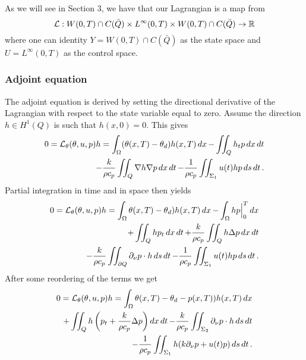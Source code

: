 As we will see in Section 3, we have that our Lagrangian is a map from 
\begin{equation*}
    \mathcal{L} : W(0,T)\cap C(\bar{Q}) \times L^{\infty}(0,T) \times  W(0,T) \cap C(\bar{Q}) \rightarrow \mathbb{R}
\end{equation*}
where one can identity $Y = W(0,T) \cap C(\bar{Q})$ as the state space and $U = L^{\infty}(0,T)$ as the control space. 

\subsubsection{Adjoint equation}
The adjoint equation is derived by setting the directional derivative of the Lagrangian with respect to the state variable equal to zero. Assume the direction $h\in H^1(Q)$ is such that $h(x, 0) = 0$. %
This gives
\begin{equation}
  \begin{aligned}
  0 = \mathcal{L}_\theta(\theta, u, p)h = \int_\Omega (\theta(x,T) - \theta_d)h(x, T)\mathop{dx} - \iint_Q h_t p\mathop{dx}\mathop{dt} \\
  - \frac{k}{\rho c_p}\iint_Q\nabla h\nabla p \mathop{dx}\mathop{dt}
  - \frac{1}{\rho c_p}\iint_{\Sigma_1} u(t)h p\mathop{ds}\mathop{dt}.
  \end{aligned}
\end{equation}
Partial integration in time and in space then yields
\begin{equation} %
  \begin{aligned}
  0 = \L_\theta(\theta, u, p)h = \int_\Omega \theta(x,T) - \theta_d)h(x, T)\dx - \int_\Omega hp\Big|_0^T \dx \\
  + \iint_Q h p_t\dxdt
  + \frac{k}{\rho c_p}\iint_Q h\Delta p \dxdt \\
  - \frac{k}{\rho c_p} \iint_{\partial Q}\partial_\nu p\cdot h\dsdt
  - \frac{1}{\rho c_p}\iint_{\Sigma_1} u(t)h p\dsdt.
  \end{aligned}
\end{equation}
After some reordering of the terms we get
\begin{equation}
  \begin{aligned}
  0 = \mathcal{L}_\theta(\theta, u, p)h = \int_\Omega \theta(x,T) - \theta_d-p(x, T))h(x, T)\mathop{dx} \\
  + \iint_Q h \left( p_t + \frac{k}{\rho c_p}\Delta p\right) \mathop{dx}\mathop{dt}
   - \frac{k}{\rho c_p} \iint_{\Sigma_2}\partial_\nu p\cdot h\mathop{ds}\mathop{dt} \\
   - \frac{1}{\rho c_p} \iint_{\Sigma_1}h(  k\partial_\nu p + u(t)p )\mathop{ds}\mathop{dt}.
  \end{aligned}
\end{equation}
